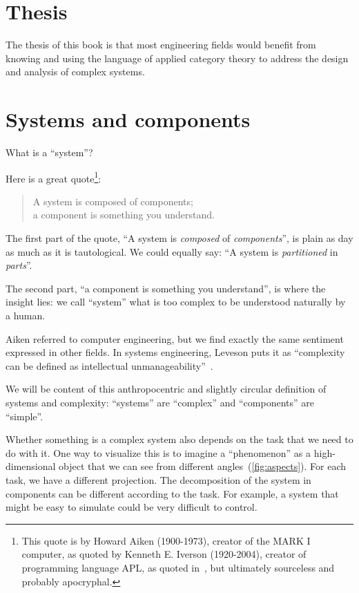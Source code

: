 

\section{Thesis}\label{sec:introduction-thesis}

The thesis of this book is that most engineering fields would benefit from knowing and using the language of applied category theory to address the design and analysis of complex systems.


\section{Systems and components}
\label{sec:introduction-systems-and-components}

What is a ``system''?

Here is a great quote\footnote{
  This quote is by Howard Aiken (1900-1973), creator of the MARK I computer,
  as quoted by Kenneth E. Iverson (1920-2004), creator of programming language APL,
  as quoted in~\cite{McIntyre1999Role}, but ultimately sourceless and probably apocryphal.
}:

\begin{quote}
  A system is composed of components;  \\
  a component is something you understand.
\end{quote}

The first part of the quote, ``A system is \emph{composed} of \emph{components}'', is plain as day as much as it is tautological. We could equally say: ``A system is \emph{partitioned} in \emph{parts}''.

The second part, ``a component is something you understand'', is where the insight lies: we call ``system'' what is too complex to be understood naturally by a human.

Aiken referred to computer engineering, but we find exactly the same sentiment expressed in other fields. In systems engineering, Leveson puts it as ``complexity can be defined as intellectual unmanageability''~\cite{leveson12engineering}.

We will be content of this anthropocentric and slightly circular definition of systems and
complexity: ``systems'' are ``complex'' and ``components'' are ``simple''.

Whether something is a complex system also depends on the task that we need to do with it. One
way to visualize this is to imagine a ``phenomenon'' as a high-dimensional object that we can see
from different angles~(\cref{fig:aspects}). For each task, we have a different
projection. The decomposition of the system in components can be different according to the
task. For example, a system that might be easy to simulate could be very difficult to control.

